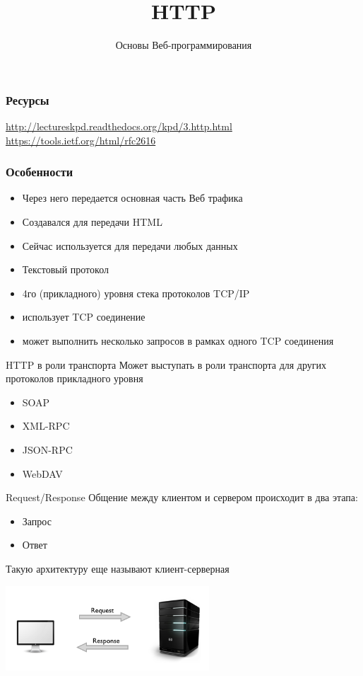 \documentclass[c,unicode,russian]{beamer}
\title{HTTP}
\author{Основы Веб-программирования}
\institute{Кафедра Интеллектуальных Информационных Технологий, ИнФО, УрФУ}
\date{}
\begin{document}
\frame{\titlepage}

\begin{frame}
\frametitle{Ресурсы}
    \url{http://lectureskpd.readthedocs.org/kpd/3.http.html}
    \url{https://tools.ietf.org/html/rfc2616}
\end{frame}

\begin{frame}
\frametitle{Особенности}
\begin{itemize}
  \item Через него передается основная часть Веб трафика
  \item Создавался для передачи HTML
  \item Сейчас используется для передачи любых данных
  \item Текстовый протокол
  \item 4го (прикладного) уровня стека протоколов TCP/IP
  \item использует TCP соединение
  \item может выполнить несколько запросов в рамках одного TCP соединения
\end{itemize}
\end{frame}

\begin{frame}{HTTP в роли транспорта}
  Может выступать в роли транспорта для других протоколов прикладного уровня
\begin{itemize}
  \item SOAP
  \item XML-RPC
  \item JSON-RPC
  \item WebDAV
\end{itemize}
\end{frame}

\begin{frame}{Request/Response}
 Общение между клиентом и сервером происходит в два этапа:
 \begin{itemize}
     \item Запрос
     \item Ответ
 \end{itemize}
 Такую архитектуру еще называют клиент-серверная
 \begin{center}
     \includegraphics[width=3in]{media/client-server.png}
 \end{center}
\end{frame}
\end{document}
